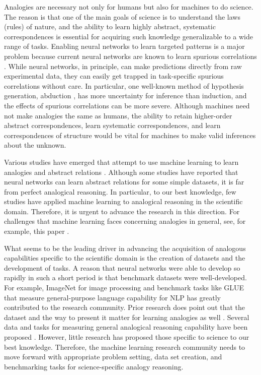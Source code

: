 \documentclass{article}
\begin{document}
Analogies are necessary not only for humans but also for machines to do science. The reason is that one of the main goals of science is to understand the laws (rules) of nature, and the ability to learn highly abstract, systematic correspondences is essential for acquiring such knowledge generalizable to a wide range of tasks. Enabling neural networks to learn targeted patterns is a major problem \cite{arjovsky2020out,shen2021towards} because current neural networks are known to learn spurious correlations \cite{chakraborty2018adversarial,geirhos2020shortcut}. While neural networks, in principle, can make predictions directly from raw experimental data, they can easily get trapped in task-specific spurious correlations without care. In particular, one well-known method of hypothesis generation, abduction \cite{hanson1965patterns}, has more uncertainty for inference than induction, and the effects of spurious correlations can be more severe. Although machines need not make analogies the same as humans, the ability to retain higher-order abstract correspondences, learn systematic correspondences, and learn correspondences of structure would be vital for machines to make valid inferences about the unknown.

Various studies have emerged that attempt to use machine learning to learn analogies and abstract relations \cite{reed2015deep,santoro2017simple,hill2018learning,barrett2018measuring,steenbrugge2018improving,van2019disentangled,zheng2019abstract,kim2020few,ushio2021bert}. Although some studies have reported that neural networks can learn abstract relations for some simple datasets, it is far from perfect analogical reasoning. In particular, to our best knowledge, few studies have applied machine learning to analogical reasoning in the scientific domain. Therefore, it is urgent to advance the research in this direction. For challenges that machine learning faces concerning analogies in general, see, for example, this paper \cite{mitchell2021abstraction}.

What seems to be the leading driver in advancing the acquisition of analogous capabilities specific to the scientific domain is the creation of datasets and the development of tasks. A reason that neural networks were able to develop so rapidly in such a short period is that benchmark datasets were well-developed. For example, ImageNet \cite{imagenet} for image processing and benchmark tasks like GLUE \cite{wang2018glue} that measure general-purpose language capability for NLP has greatly contributed to the research community. Prior research does point out that the dataset and the way to present it matter for learning analogies as well \cite{hill2018learning}. Several data and tasks for measuring general analogical reasoning capability have been proposed \cite{wang2015automatic,zhang2019raven,hu2021stratified,chollet2019measure}. However, little research has proposed those specific to science to our best knowledge. Therefore, the machine learning research community needs to move forward with appropriate problem setting, data set creation, and benchmarking tasks for science-specific analogy reasoning.
\end{document}
